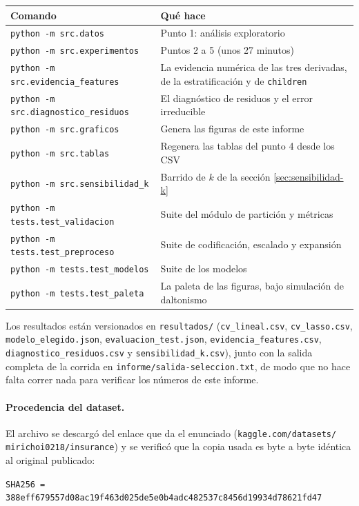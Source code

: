 \documentclass[11pt,a4paper]{article}
\begin{document}
\begin{table}[H]
\centering
\begin{tabular}{@{}l p{8.2cm}@{}}
\toprule
\textbf{Comando} & \textbf{Qué hace} \\
\midrule
\texttt{python -m src.datos}       & Punto 1: análisis exploratorio \\
\texttt{python -m src.experimentos}& Puntos 2 a 5 (unos 27 minutos) \\
\texttt{python -m src.evidencia\_features} & La evidencia numérica de las tres derivadas, de la estratificación y de \texttt{children} \\
\texttt{python -m src.diagnostico\_residuos} & El diagnóstico de residuos y el error irreducible \\
\texttt{python -m src.graficos}    & Genera las figuras de este informe \\
\texttt{python -m src.tablas}      & Regenera las tablas del punto 4 desde los CSV \\
\texttt{python -m src.sensibilidad\_k} & Barrido de $k$ de la sección \ref{sec:sensibilidad-k} \\
\texttt{python -m tests.test\_validacion} & Suite del módulo de partición y métricas \\
\texttt{python -m tests.test\_preproceso} & Suite de codificación, escalado y expansión \\
\texttt{python -m tests.test\_modelos}    & Suite de los modelos \\
\texttt{python -m tests.test\_paleta}     & La paleta de las figuras, bajo simulación de daltonismo \\
\bottomrule
\end{tabular}
\end{table}

\begin{sloppypar}
Los resultados están versionados en \texttt{resultados/} (\texttt{cv\_lineal.csv},
\texttt{cv\_lasso.csv}, \texttt{modelo\_elegido.json}, \texttt{evaluacion\_test.json},
\texttt{evidencia\_features.csv}, \texttt{diagnostico\_residuos.csv} y
\texttt{sensibilidad\_k.csv}), junto con la salida completa de la corrida en
\texttt{informe/salida-seleccion.txt}, de modo que no hace falta correr nada para verificar los
números de este informe.
\end{sloppypar}

\paragraph{Procedencia del dataset.}
\begin{sloppypar}
El archivo se descargó del enlace que da el enunciado
(\texttt{kaggle.com/datasets/} \texttt{mirichoi0218/insurance}) y se verificó que la copia
usada es byte a byte idéntica al original publicado:
\end{sloppypar}

\begin{center}
\texttt{\footnotesize SHA256 = 388eff679557d08ac19f463d025de5e0b4adc482537c8456d19934d78621fd47}
\end{center}
\end{document}
